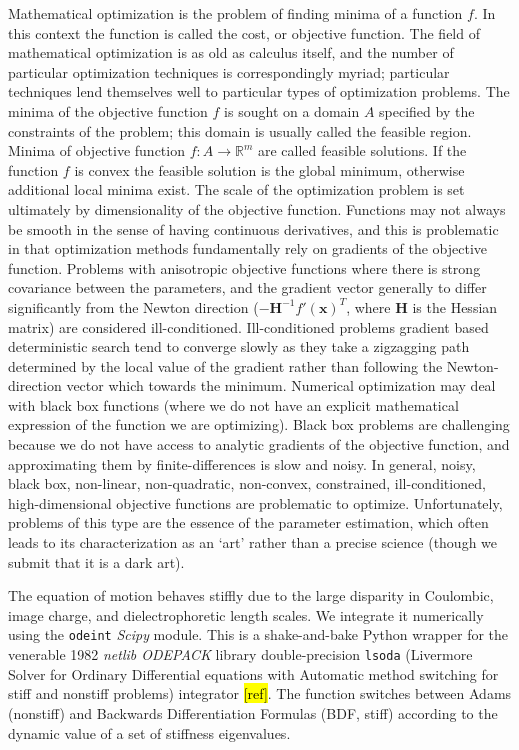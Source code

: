 \documentclass[10pt,a4paper]{article}
\begin{document}
Mathematical optimization is the problem of finding minima of a function $f$. In this context the function is called the cost, or objective function. The field of mathematical optimization is as old as calculus itself, and the number of particular optimization techniques is correspondingly myriad; particular techniques lend themselves well to particular types of optimization problems. The minima of the objective function $f$ is sought on a domain $A$ specified by the constraints of the problem; this domain is usually called the feasible region. Minima of objective function $f: A \rightarrow \mathbb{R}^m$ are called feasible solutions. If the function $f$ is convex the feasible solution is the global minimum, otherwise additional local minima exist. The scale of the optimization problem is set ultimately by dimensionality of the objective function. Functions may not always be smooth in the sense of having continuous derivatives, and this is problematic in that optimization methods fundamentally rely on gradients of the objective function. Problems with anisotropic objective functions where there is strong covariance between the parameters, and the gradient vector generally to differ significantly from the Newton direction ($-\mathbf{H}^{-1} f' ( \mathbf{x} )^T$, where $\mathbf{H}$ is the Hessian matrix) are considered ill-conditioned. Ill-conditioned problems gradient based deterministic search tend to converge slowly as they take a zigzagging path determined by the local value of the gradient rather than following the Newton-direction vector which towards the minimum. Numerical optimization may deal with black box functions (where we do not have an explicit mathematical expression of the function we are optimizing). Black box problems are challenging because we do not have access to analytic gradients of the objective function, and approximating them by finite-differences is slow and noisy. In general, noisy, black box, non-linear, non-quadratic, non-convex, constrained, ill-conditioned, high-dimensional objective functions are problematic to optimize. Unfortunately, problems of this type are the essence of the parameter estimation, which often leads to its characterization as an `art' rather than a precise science (though we submit that it is a dark art).   

The equation of motion behaves stiffly due to the large disparity in Coulombic, image charge, and dielectrophoretic length scales. We integrate it numerically using the \verb|odeint| \emph{Scipy} module. This is a shake-and-bake Python wrapper for the venerable 1982 \emph{netlib ODEPACK} library double-precision \verb|lsoda| (Livermore Solver for Ordinary Differential equations with Automatic method switching for stiff and nonstiff problems) integrator \hl{[ref]}. The function switches between Adams (nonstiff) and Backwards Differentiation Formulas (BDF, stiff) according to the dynamic value of a set of stiffness eigenvalues.
\end{document}
